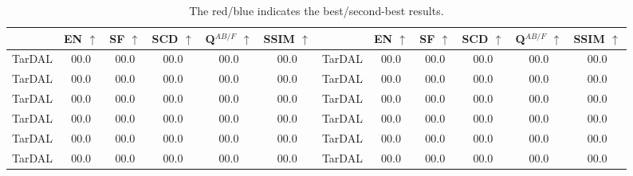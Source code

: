 \documentclass[letterpaper]{article} %
\begin{document}
\begin{table}[ht!]
{\begin{tabular}{ccccc ccccc cc}
                &EN $\uparrow$ &SF $\uparrow$ &SCD $\uparrow$  &Q$^{AB/F}$ $\uparrow$  &SSIM $\uparrow$  &  &EN $\uparrow$ &SF $\uparrow$ &SCD $\uparrow$  &Q$^{AB/F}$ $\uparrow$  &SSIM $\uparrow$  \\
\midrule[0.5pt]
TarDAL&\cellcolor{color_blue}00.0 &\cellcolor{blue!8}00.0 &00.0 &00.0 &00.0 &TarDAL &00.0 &\cellcolor{blue!8}00.0 &00.0 &\cellcolor{color_blue}00.0 &\cellcolor{color_blue}00.0 \\
TarDAL&\cellcolor{color_blue}00.0 &\cellcolor{blue!8}00.0 &00.0 &00.0 &00.0 &TarDAL &00.0 &\cellcolor{blue!8}00.0 &00.0 &\cellcolor{color_blue}00.0 &\cellcolor{color_blue}00.0 \\
TarDAL&\cellcolor{color_blue}00.0 &\cellcolor{blue!8}00.0 &00.0 &00.0 &00.0 &TarDAL &00.0 &\cellcolor{blue!8}00.0 &00.0 &\cellcolor{color_blue}00.0 &\cellcolor{color_blue}00.0 \\
TarDAL&\cellcolor{color_blue}00.0 &\cellcolor{blue!8}00.0 &00.0 &00.0 &00.0 &TarDAL &00.0 &\cellcolor{blue!8}00.0 &00.0 &\cellcolor{color_blue}00.0 &\cellcolor{color_blue}00.0 \\
TarDAL&\cellcolor{color_blue}00.0 &\cellcolor{blue!8}00.0 &00.0 &00.0 &00.0 &TarDAL &00.0 &\cellcolor{blue!8}00.0 &00.0 &\cellcolor{color_blue}00.0 &\cellcolor{color_blue}00.0 \\
TarDAL&\cellcolor{color_blue}00.0 &\cellcolor{blue!8}00.0 &00.0 &00.0 &00.0 &TarDAL &00.0 &\cellcolor{blue!8}00.0 &00.0 &\cellcolor{color_blue}00.0 &\cellcolor{color_blue}00.0 \\
             \bottomrule
       \end{tabular}
   }
   \caption{The red/blue indicates the best/second-best results.}
\end{table}
\end{document}
